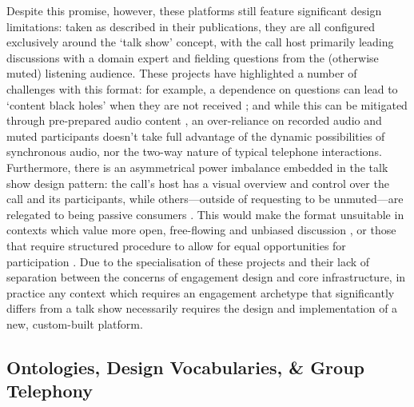 Despite this promise, however, these platforms still feature significant design limitations: taken as described in their publications, they are all configured exclusively around the `talk show' concept, with the call host primarily leading discussions with a domain expert and fielding questions from the (otherwise muted) listening audience. These projects have highlighted a number of challenges with this format: for example, a dependence on questions can lead to `content black holes' when they are not received \cite{Kazakos2016}; and while this can be mitigated through pre-prepared audio content \cite{Yadav2017}, an over-reliance on recorded audio and muted participants doesn't take full advantage of the dynamic possibilities of synchronous audio, nor the two-way nature of typical telephone interactions. Furthermore, there is an asymmetrical power imbalance embedded in the talk show design pattern: the call's host has a visual overview and control over the call and its participants, while others---outside of requesting to be unmuted---are relegated to being passive consumers \cite{Varghese2022}. This would make the format unsuitable in contexts which value more open, free-flowing and unbiased discussion \cite{Fiesler2019}, or those that require structured procedure to allow for equal opportunities for participation \cite{robert2020}. Due to the specialisation of these projects and their lack of separation between the concerns of engagement design and core infrastructure, in practice any context which requires an engagement archetype that significantly differs from a talk show necessarily requires the design and implementation of a new, custom-built platform.

\subsection{Ontologies, Design Vocabularies, \& Group Telephony}


